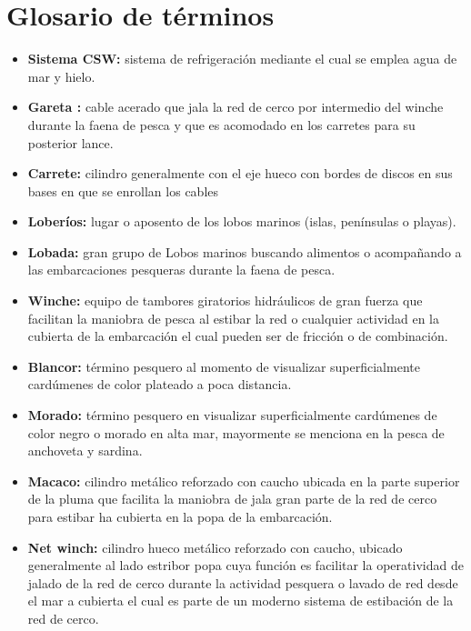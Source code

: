 \documentclass[a4paper,oneside,11pt]{book}
\begin{document}
\section{Glosario de términos}
\begin{itemize}
\item{\textbf{Sistema CSW:}} sistema de refrigeración mediante el cual se emplea agua de mar y hielo.

\item{\textbf{Gareta :}} cable acerado que jala la red de cerco  por intermedio del winche  durante la faena de pesca y que es acomodado en los carretes para su posterior lance. 

\item {\textbf{Carrete:}} cilindro generalmente con el eje hueco con bordes de discos en sus bases en que se enrollan los cables 

\item {\textbf{Loberíos:}} lugar o aposento de los lobos marinos (islas, penínsulas o playas).

\item{\textbf{Lobada:}} gran grupo de Lobos marinos buscando alimentos o acompañando a las embarcaciones pesqueras durante la faena de pesca.

\item{\textbf{Winche:}}  equipo de tambores giratorios hidráulicos de gran fuerza que facilitan la maniobra de pesca  al estibar la red o cualquier actividad en la cubierta de la embarcación el cual pueden ser de fricción o de combinación. 
  
\item{\textbf{Blancor:}} término pesquero al momento de visualizar superficialmente cardúmenes de color plateado a poca distancia.

\item{\textbf{Morado:}} término pesquero en visualizar superficialmente cardúmenes de color negro o morado en alta mar, mayormente se menciona en la pesca de anchoveta y sardina.
  
\item{\textbf{Macaco:}} cilindro metálico reforzado con caucho  ubicada en la parte  superior de la pluma que facilita la maniobra de jala gran parte de la red de cerco  para estibar ha cubierta en la popa de la embarcación.   

\item{\textbf{Net winch:}} cilindro hueco metálico reforzado con caucho, ubicado generalmente al lado estribor popa cuya función es facilitar  la operatividad de jalado de la red de cerco durante la actividad pesquera o lavado  de red desde el mar a cubierta el cual es parte de un moderno sistema de estibación de la red de cerco.


\end{itemize}
\end{document}
